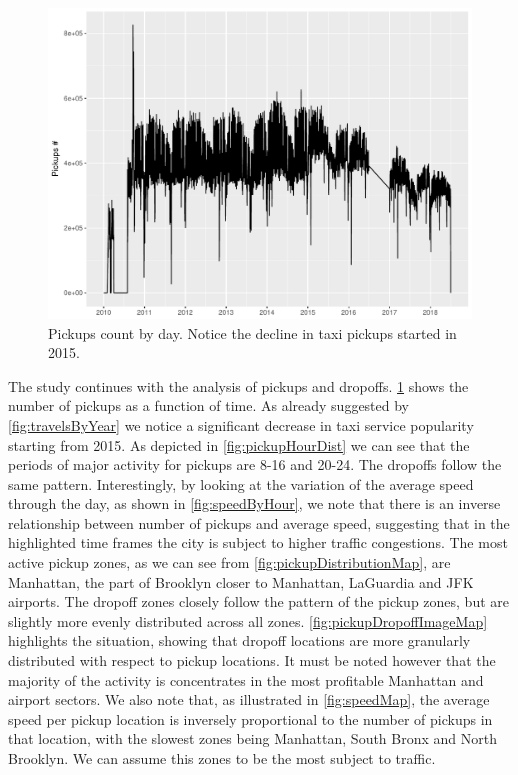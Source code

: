 \documentclass{acm_proc_article-sp-sigmod09}
\begin{document}
\begin{figure}
	\centering
	\includegraphics[width=1\columnwidth]{resources/base_plots/overall_pickups.pdf}
	\caption{Pickups count by day. Notice the decline in taxi pickups started in 2015.}
	\label{fig:overallPickups}
\end{figure}

The study continues with the analysis of pickups and dropoffs. \cref{fig:overallPickups} shows the number of pickups as a function of time. As already suggested by \cref{fig:travelsByYear} we notice a significant decrease in taxi service popularity starting from 2015. As depicted in \cref{fig:pickupHourDist} we can see that the periods of major activity for pickups are 8-16 and 20-24. The dropoffs follow the same pattern. Interestingly, by looking at the variation of the average speed through the day, as shown in \cref{fig:speedByHour}, we note that there is an inverse relationship between number of pickups and average speed, suggesting that in the highlighted time frames the city is subject to higher traffic congestions.
The most active pickup zones, as we can see from \cref{fig:pickupDistributionMap}, are Manhattan, the part of Brooklyn closer to Manhattan, LaGuardia and JFK airports. The dropoff zones closely follow the pattern of the pickup zones, but are slightly more evenly distributed across all zones. \cref{fig:pickupDropoffImageMap} highlights the situation, showing that dropoff locations are more granularly distributed with respect to pickup locations. It must be noted however that the majority of the activity is concentrates in the most profitable Manhattan and airport sectors.
We also note that, as illustrated in \cref{fig:speedMap}, the average speed per pickup location is inversely proportional to the number of pickups in that location, with the slowest zones being Manhattan, South Bronx and North Brooklyn. We can assume this zones to be the most subject to traffic.
\end{document}
